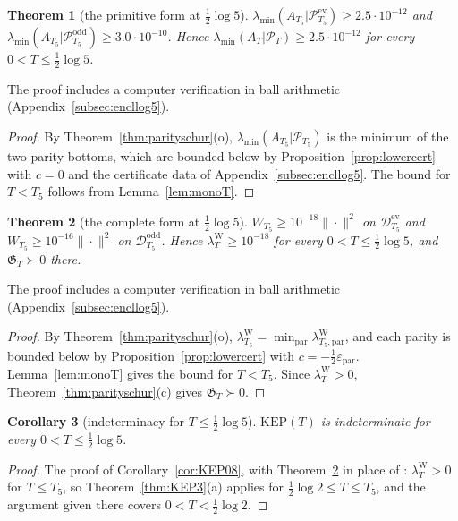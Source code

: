 \documentclass[11pt]{amsart}
\newtheorem{theorem}{Theorem}[section]
\newtheorem{corollary}[theorem]{Corollary}
\theoremstyle{definition}
\theoremstyle{remark}
\newcommand{\PT}{\mathcal P_T}
\newcommand{\lamW}{\lambda^{\mathrm W}_T}
\newcommand{\lamA}{\lambda_{\min}(A_T|\PT)}
\begin{document}
\begin{theorem}[the primitive form at $\frac12\log5$]\label{thm:log5A}
$\lambda_{\min}(A_{T_5}|\mathcal P^{\mathrm{ev}}_{T_5})\ge2.5\cdot10^{-12}$ and
$\lambda_{\min}(A_{T_5}|\mathcal P^{\mathrm{odd}}_{T_5})\ge3.0\cdot10^{-10}$. Hence
$\lamA\ge2.5\cdot10^{-12}$ for every $0<T\le\frac12\log5$.
\end{theorem}

\noindent The proof includes a computer verification in ball arithmetic (Appendix~\ref{subsec:encllog5}).

\begin{proof}
By Theorem~\ref{thm:parityschur}(o), $\lambda_{\min}(A_{T_5}|\mathcal P_{T_5})$ is the minimum of the two
parity bottoms, which are bounded below by Proposition~\ref{prop:lowercert} with $c=0$ and the
certificate data of Appendix~\ref{subsec:encllog5}. The bound for $T<T_5$ follows from
Lemma~\ref{lem:monoT}.
\end{proof}

\begin{theorem}[the complete form at $\frac12\log5$]\label{thm:log5W}
$W_{T_5}\ge10^{-18}\|\cdot\|^2$ on $\mathcal D^{\mathrm{ev}}_{T_5}$ and $W_{T_5}\ge10^{-16}\|\cdot\|^2$ on
$\mathcal D^{\mathrm{odd}}_{T_5}$. Hence $\lamW\ge10^{-18}$ for every $0<T\le\frac12\log5$, and
$\mathfrak G_T\succ0$ there.
\end{theorem}

\noindent The proof includes a computer verification in ball arithmetic (Appendix~\ref{subsec:encllog5}).

\begin{proof}
By Theorem~\ref{thm:parityschur}(o), $\lambda^{\mathrm W}_{T_5}=\min_{\mathrm{par}}\lambda^{\mathrm W}_{T_5,\mathrm{par}}$,
and each parity is bounded below by Proposition~\ref{prop:lowercert} with $c=-\frac12\varepsilon_{\mathrm{par}}$.
Lemma~\ref{lem:monoT} gives the bound for $T<T_5$. Since $\lamW>0$, Theorem~\ref{thm:parityschur}(c)
gives $\mathfrak G_T\succ0$.
\end{proof}

\begin{corollary}[indeterminacy for $T\le\frac12\log5$]\label{cor:KEPlog5}
$\mathrm{KEP}(T)$ is indeterminate for every $0<T\le\frac12\log5$.
\end{corollary}
\begin{proof}
The proof of Corollary~\ref{cor:KEP08}, with Theorem~\ref{thm:log5W} in place of
\cite[Thm.~1.2]{Zhu2026}: $\lamW>0$ for $T\le T_5$, so Theorem~\ref{thm:KEP3}(a) applies for
$\frac12\log2\le T\le T_5$, and the argument given there covers $0<T<\frac12\log2$.
\end{proof}
\end{document}
